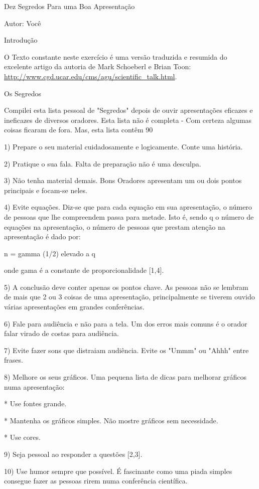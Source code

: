 \documentclass[12pt]{article}
\begin{document}
Dez Segredos Para uma Boa Apresentação

Autor: Você

Introdução

O Texto constante neste exercício é uma versão traduzida e resumida do excelente artigo da autoria de Mark Schoeberl e Brian Toon:
\url{http://www.cgd.ucar.edu/cms/agu/scientific_talk.html}.

Os Segredos

Compilei esta lista pessoal de "Segredos" depois de ouvir apresentações eficazes e ineficazes de diversos oradores. Esta lista não é completa - Com certeza algumas coisas ficaram de fora. Mas, esta lista contêm 90%

1) Prepare o seu material cuidadosamente e logicamente. Conte uma história.

2) Pratique o sua fala. Falta de preparação não é uma desculpa.

3) Não tenha  material demais. Bons Oradores apresentam um ou dois pontos principais e focam-se neles.

4) Evite equações. Diz-se que para cada equação em sua apresentação, o número de pessoas que lhe compreendem passa para metade. Isto é, sendo q o número de equações na apresentação, o número de pessoas que prestam atenção na apresentação é dado por:

n = gamma (1/2) elevado a q

onde gama é a constante de proporcionalidade [1,4].

5) A conclusão deve conter apenas os pontos chave. As pessoas não se lembram de mais que 2 ou 3 coisas de uma apresentação, principalmente se tiverem ouvido várias apresentações em grandes conferências.

6) Fale para audiência e não para a tela. Um dos erros mais comuns é o orador falar virado de costas para audiência.

7) Evite fazer sons que distraiam audiência. Evite os "Ummm" ou "Ahhh" entre frases.

8) Melhore os seus gráficos. Uma pequena lista de dicas para melhorar gráficos numa apresentação:

* Use  fontes grande.

* Mantenha os gráficos simples. Não mostre gráficos sem necessidade.

* Use cores.

9) Seja pessoal ao responder a questões [2,3].

10) Use humor sempre que possível. É fascinante como uma piada simples consegue fazer as pessoas rirem numa conferência científica.
\end{document}
